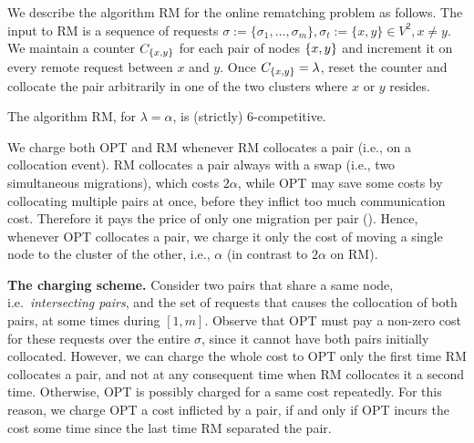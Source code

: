 \documentclass[manuscript,screen=true, review, anonymous]{acmart}
\newcommand{\OPT}{\textsf{OPT}\xspace}
\newcommand{\RM}{\textsf{RM}\xspace} %
\DeclarePairedDelimiter\set{\{}{\}}
\newcommand\mahmoud[1]{}
\newcommand\maciek[1]{}
\begin{document}
\maciek{Intro: compare to previous 7-competitive algorithm. Note strict competitive ratio vs large additive term. Also, emphasize that in this section the algorithm is different than DET2}

We describe the algorithm \RM for the online rematching problem as follows.
The input to \RM is a sequence of  requests
$\sigma:=\{\sigma_1,\dots, \sigma_m\}, \sigma_t:=\{x,y\} \in V^2, x \neq y$.
We maintain a counter $C_{\set{x,y}}$ for each pair of nodes $\set{x,y}$ and increment it on every remote request between $x$ and $y$.
Once $C_{\set{x,y}} = \lambda$,
reset the counter and collocate the pair arbitrarily in one of the two clusters where $x$ or $y$ resides.

\begin{theorem} \label{thm:k=2}
	The algorithm \RM, for $\lambda=\alpha$, is (strictly) 6-competitive.
\end{theorem}


We charge both \OPT and \RM whenever \RM collocates a pair (i.e., on a collocation event).
\RM collocates a pair always with a swap (i.e., two simultaneous migrations),
which  costs $2\alpha$,
while OPT may save some costs by collocating multiple pairs at once, 
 before they inflict too much communication cost.
 Therefore it pays the price of only one migration per pair  (\mahmoud{see Figure \ref{fig:TBD}}).
Hence,
whenever \OPT collocates a pair,
we charge it only the cost of moving a single node to the cluster of the other,
i.e., $\alpha$ (in contrast to $2\alpha$ on \RM).

\textbf{The charging scheme.}
Consider two  pairs that share a same node, 
i.e.~\emph{intersecting pairs},
and the set of requests that causes the collocation of both pairs,
at some  times during  $[1,m]$.
Observe that \OPT must pay a non-zero cost
for these requests over the entire $\sigma$,
since it cannot have both pairs initially collocated.
%
%
However,
we can charge the whole cost to \OPT only the first time \RM collocates a pair,
and not at any consequent time when \RM collocates it a second time.
Otherwise,
 \OPT is possibly charged for a same cost repeatedly.
For this reason,
we charge \OPT a cost inflicted by a pair,
if and only if  \OPT incurs the cost some time since the last time \RM separated the pair.
\end{document}
